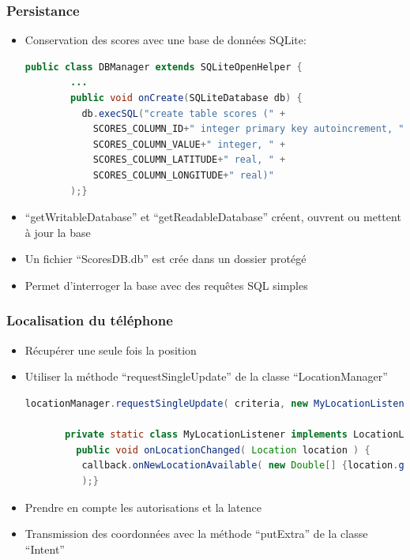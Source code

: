 \documentclass[handout]{beamer}
\begin{document}
\begin{frame}[fragile]
  \frametitle<1->{Persistance}
    \begin{itemize}
    \item <1->{Conservation des scores avec une base de données SQLite:}
    \begin{lstlisting}[language=java]
      public class DBManager extends SQLiteOpenHelper {
        ...
        public void onCreate(SQLiteDatabase db) { 
          db.execSQL("create table scores (" +
            SCORES_COLUMN_ID+" integer primary key autoincrement, " +
            SCORES_COLUMN_VALUE+" integer, " +
            SCORES_COLUMN_LATITUDE+" real, " +
            SCORES_COLUMN_LONGITUDE+" real)"
        );}
    \end{lstlisting}
    \item <2->{\enquote{getWritableDatabase} et \enquote{getReadableDatabase} créent, ouvrent ou mettent à jour la base}
    \item <3->{Un fichier \enquote{ScoresDB.db} est crée dans un dossier protégé}
    \item <4->{Permet d'interroger la base avec des requêtes SQL simples} %
    \end{itemize}
\end{frame}

\begin{frame}[fragile]
  \frametitle<1->{Localisation du téléphone}
    \begin{itemize} %
    \item <1->{Récupérer une seule fois la position} %
    \item <2->{Utiliser la méthode \enquote{requestSingleUpdate} de la classe \enquote{LocationManager}}
    \begin{lstlisting}[language=java]
       locationManager.requestSingleUpdate( criteria, new MyLocationListener( callback ), null );

       private static class MyLocationListener implements LocationListener { ...
         public void onLocationChanged( Location location ) {
          callback.onNewLocationAvailable( new Double[] {location.getLatitude(), location.getLongitude()} 
          );}
    \end{lstlisting}
    \item <3->{Prendre en compte les autorisations et la latence} %
    \item <3->{Transmission des coordonnées avec la méthode \enquote{putExtra} de la classe \enquote{Intent}} %
    \end{itemize}
\end{frame}
\end{document}
